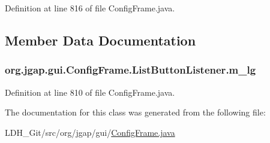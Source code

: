 Definition at line 816 of file Config\-Frame.\-java.



\subsection{Member Data Documentation}
\hypertarget{classorg_1_1jgap_1_1gui_1_1_config_frame_1_1_list_button_listener_a68f06148b5c2eded895f867ea726fe43}{
\subsubsection[{m\-\_\-lg}]{ org.\-jgap.\-gui.\-Config\-Frame.\-List\-Button\-Listener.\-m\-\_\-lg\hspace{0.3cm}{\ttfamily [private]}}}\label{classorg_1_1jgap_1_1gui_1_1_config_frame_1_1_list_button_listener_a68f06148b5c2eded895f867ea726fe43}


Definition at line 810 of file Config\-Frame.\-java.



The documentation for this class was generated from the following file\-:\begin{DoxyCompactItemize}
\item 
L\-D\-H\-\_\-\-Git/src/org/jgap/gui/\hyperlink{_config_frame_8java}{Config\-Frame.\-java}\end{DoxyCompactItemize}
